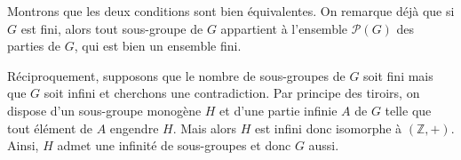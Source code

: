 Montrons que les deux conditions sont bien équivalentes. On remarque déjà que si 
$G$ est fini, alors tout sous-groupe de $G$ appartient à l'ensemble $\mathscr P(G)$ des parties de $G$, qui est bien un ensemble fini.

Réciproquement, supposons que le nombre de sous-groupes de $G$ soit fini mais que $G$ soit infini et cherchons une contradiction.
Par principe des tiroirs, on dispose d'un sous-groupe monogène $H$ et d'une partie infinie $A$ de $G$ telle que tout élément de $A$ engendre $H$.
Mais alors $H$ est infini donc isomorphe à $(\mathbb Z,+)$. Ainsi, $H$ admet une infinité de sous-groupes et donc $G$ aussi.
